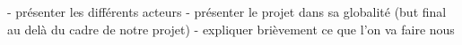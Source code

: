 - présenter les différents acteurs
- présenter le projet dans sa globalité (but final au delà du cadre de notre projet)
- expliquer brièvement ce que l'on va faire nous